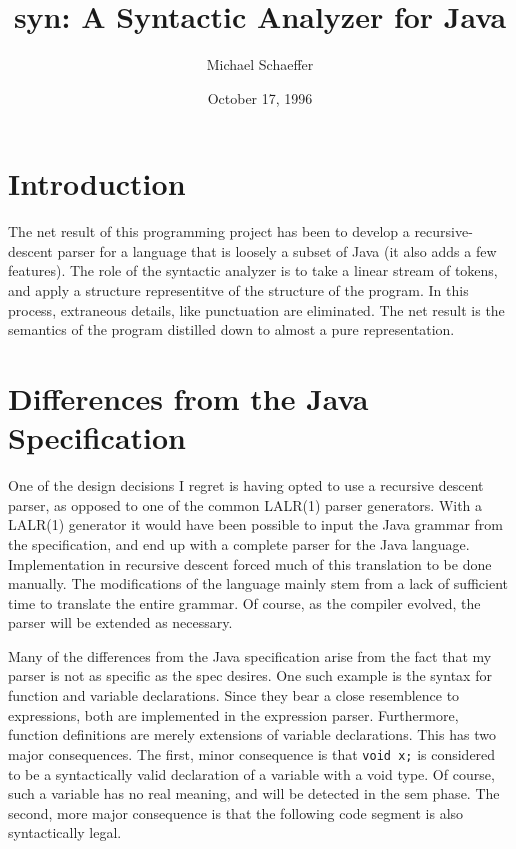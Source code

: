 \documentclass{article}[1994/05/24]
\title{syn: A Syntactic Analyzer for Java}
\author{Michael Schaeffer}
\date{October 17, 1996}
\begin{document}
\maketitle


\section{Introduction}

	The net result of this programming project has been
to develop a recursive-descent parser for a language that is
loosely a subset of Java (it also adds a few features). The
role of the syntactic analyzer is to take a linear stream of
tokens, and apply a structure representitve of the structure
of the program.  In this process, extraneous details, like
punctuation are eliminated.  The net result is the semantics
of the program distilled down to almost a pure representation.

\section{Differences from the Java Specification}

	One of the design decisions I regret is having opted 
to use a recursive descent parser, as opposed to one of the 
common LALR(1) parser generators.  With a LALR(1) generator
it would have been possible to input the Java grammar from the
specification, and end up with a complete parser for the Java
language.  Implementation in recursive descent forced much
of this translation to be done manually.  The modifications
of the language mainly stem from a lack of sufficient time
to translate the entire grammar.  Of course, as the compiler
evolved, the parser will be extended as necessary.

	Many of the differences from the Java specification
arise from the fact that my parser is not as specific as the
spec desires. One such example is the syntax for function
and variable declarations.  Since they bear a close resemblence
to expressions, both are implemented in the expression parser.
Furthermore, function definitions are merely extensions of
variable declarations.  This has two major consequences.  The
first, minor consequence is that \verb|void x;| is considered
to be a syntactically valid declaration of a variable with
a void type.  Of course, such a variable has no real meaning,
and will be detected in the sem phase. The second, more
major consequence is that the following code segment is also
syntactically legal.
\end{document}

